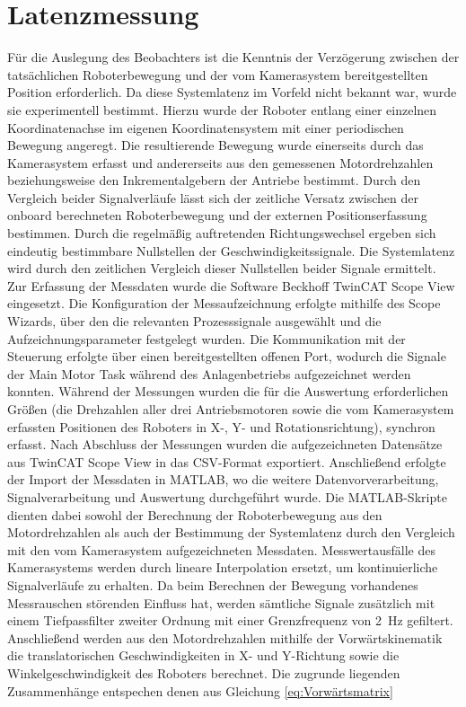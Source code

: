 \section{Latenzmessung}
Für die Auslegung des Beobachters ist die Kenntnis der Verzögerung zwischen der tatsächlichen Roboterbewegung und der vom Kamerasystem bereitgestellten Position erforderlich. Da diese Systemlatenz im Vorfeld nicht bekannt war, wurde sie experimentell bestimmt. Hierzu wurde der Roboter entlang einer einzelnen Koordinatenachse im eigenen Koordinatensystem mit einer periodischen Bewegung angeregt. Die resultierende Bewegung wurde einerseits durch das Kamerasystem erfasst und andererseits aus den gemessenen Motordrehzahlen beziehungsweise den Inkrementalgebern der Antriebe bestimmt. Durch den Vergleich beider Signalverläufe lässt sich der zeitliche Versatz zwischen der onboard berechneten Roboterbewegung und der externen Positionserfassung bestimmen. Durch die regelmäßig auftretenden Richtungswechsel ergeben sich eindeutig bestimmbare Nullstellen der Geschwindigkeitssignale. Die Systemlatenz wird durch den zeitlichen Vergleich dieser Nullstellen beider Signale ermittelt. Zur Erfassung der Messdaten wurde die Software Beckhoff TwinCAT Scope View eingesetzt. Die Konfiguration der Messaufzeichnung erfolgte mithilfe des Scope Wizards, über den die relevanten Prozesssignale ausgewählt und die Aufzeichnungsparameter festgelegt wurden. Die Kommunikation mit der Steuerung erfolgte über einen bereitgestellten offenen Port, wodurch die Signale der Main Motor Task während des Anlagenbetriebs aufgezeichnet werden konnten. Während der Messungen wurden die für die Auswertung erforderlichen Größen (die Drehzahlen aller drei Antriebsmotoren sowie die vom Kamerasystem erfassten Positionen des Roboters in X-, Y- und Rotationsrichtung), synchron erfasst. Nach Abschluss der Messungen wurden die aufgezeichneten Datensätze aus TwinCAT Scope View in das CSV-Format exportiert. Anschließend erfolgte der Import der Messdaten in MATLAB, wo die weitere Datenvorverarbeitung, Signalverarbeitung und Auswertung durchgeführt wurde. Die MATLAB-Skripte dienten dabei sowohl der Berechnung der Roboterbewegung aus den Motordrehzahlen als auch der Bestimmung der Systemlatenz durch den Vergleich mit den vom Kamerasystem aufgezeichneten Messdaten. Messwertausfälle des Kamerasystems werden durch lineare Interpolation ersetzt, um kontinuierliche Signalverläufe zu erhalten. Da beim Berechnen der Bewegung vorhandenes Messrauschen störenden Einfluss hat, werden sämtliche Signale zusätzlich mit einem Tiefpassfilter zweiter Ordnung mit einer Grenzfrequenz von \SI{2}{\hertz} gefiltert. Anschließend werden aus den Motordrehzahlen mithilfe der Vorwärtskinematik die translatorischen Geschwindigkeiten in X- und Y-Richtung sowie die Winkelgeschwindigkeit des Roboters berechnet. Die zugrunde liegenden Zusammenhänge entspechen denen aus Gleichung \ref{eq:Vorwärtsmatrix}

